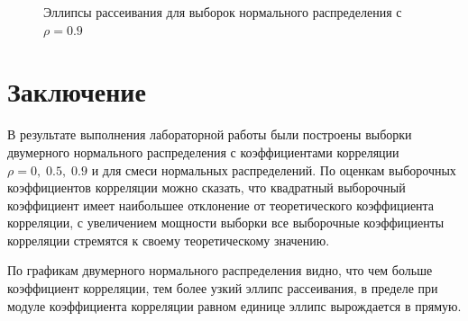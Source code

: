 \documentclass[12pt]{article}
\begin{document}
\begin{flushleft}
\begin{figure}[h!]
\begin{minipage}[h]{0.325\linewidth}
            \end{minipage}
            \begin{minipage}[h]{0.325\linewidth}
            \end{minipage}
            \caption{Эллипсы рассеивания для выборок нормального распределения с $\rho = 0.9$}
            \label{rho_09}
            \end{figure}

\newpage

\section*{Заключение}

        В результате выполнения лабораторной работы были построены выборки двумерного нормального распределения с коэффициентами корреляции $\rho = 0, \; 0.5, \; 0.9$ и для смеси нормальных распределений. По оценкам выборочных коэффициентов корреляции можно сказать, что квадратный выборочный коэффициент имеет наибольшее отклонение от теоретического коэффициента корреляции, с увеличением мощности выборки все выборочные коэффициенты корреляции стремятся к своему теоретическому значению.

        По графикам двумерного нормального распределения видно, что чем больше коэффициент корреляции, тем более узкий эллипс рассеивания, в пределе при модуле коэффициента корреляции равном единице эллипс вырождается в прямую.


\end{flushleft}
\end{document}
